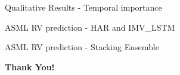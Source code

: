 




\begin{frame}{Qualitative Results - Temporal importance}




\end{frame}


\begin{frame}{ASML RV prediction - HAR and IMV\_LSTM}

    

    

    
\end{frame}




\begin{frame}{ASML RV prediction - Stacking Ensemble}

    

    
\end{frame}

{
\begin{frame}
\centering
\vfill
{\Huge\color{white}\bfseries Thank You!}
\vfill
\end{frame}
}




